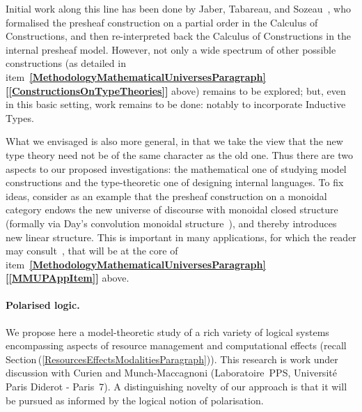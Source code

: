 \documentclass[11pt,twocolumn]{article}
\newcommand{\hide}[1]{}
\newcommand{\pref}[1]{\,(\ref{#1})}
\newcommand{\itemref}[1]{\textbf{[\ref{#1}]}}
\begin{document}
Initial work along this line has been done by Jaber, Tabareau, and
Sozeau~\cite{TypeTheoryWithForcing}, who formalised the presheaf
construction on a partial order in the Calculus of Constructions, and then
re-interpreted back the Calculus of Constructions in the internal presheaf
model.  However, not only a wide spectrum of other possible constructions
(as detailed in
item~\textbf{\ref{MethodologyMathematicalUniversesParagraph}}\thinspace\itemref{ConstructionsOnTypeTheories}
above) remains to be explored; but, even in this basic setting, work remains
to be done: notably to incorporate Inductive Types.

What we envisaged is also more general, in that we take the view that the
new type theory need not be of the same character as the old one.  Thus
there are two aspects to our proposed investigations: the mathematical one
of studying model constructions and the type-theoretic one of designing
internal languages.  To fix ideas, consider as an example that the
presheaf construction on a monoidal category endows the new universe of
discourse with monoidal closed structure (formally via Day's convolution
monoidal structure~\cite{Day}), and thereby introduces new linear structure.
This is important in many applications, for which the reader may
consult~\cite{FioreFossacs}, %
that will be at the core of
item~\mbox{\textbf{\ref{MethodologyMathematicalUniversesParagraph}}\thinspace\textbf{\itemref{MMUPAppItem}}}
above.

\hide{
The study of Cohen Forcing for type theory was stated as an open problem
by Beeson~\cite{BeesonBook}, who wrote: ``Forcing has yet to be worked out
directly for Martin-L\"of's system.''.  Work in this direction has only
recently begun.  Specifically, by Coquand and Jaber~\cite{CoquandNote} who
presented an interesting example.  Much remains to be explored both with
respect to the vast literature on set-theoretic forcing and, more
relevantly, with respect to Krivine's Classical
Realizability~\cite{KrivineRA}, an extension of forcing.
}

\paragraph{Polarised logic.}
\label{PolarisationParagraph}

We propose here a model-theoretic study of a rich variety of logical
systems encompassing aspects of resource management and computational
effects (recall Section\pref{ResourcesEffectsModalitiesParagraph}).  This
research is work under discussion with Curien and
Munch-Maccagnoni (Laboratoire~PPS, Universit\'e Paris Diderot - Paris~7).
A distinguishing novelty of our approach is that it will be pursued as
informed by the logical notion of polarisation.
\end{document}
